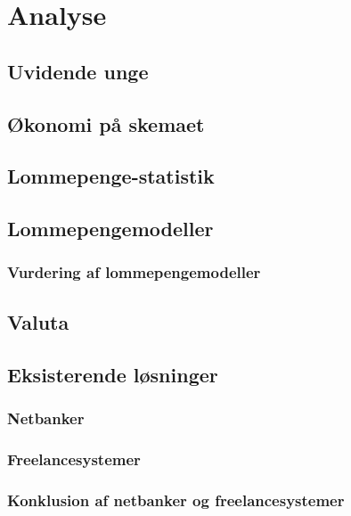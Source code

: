 \chapter{Analyse}

\section{Uvidende unge}
\label{UvidendeUnge}

\section{Økonomi på skemaet}
\label{Okonomi}

\section{Lommepenge-statistik}
\label{LommeStat}

\section{Lommepengemodeller}
\label{LommeModeller}
\subsection{Vurdering af lommepengemodeller}
\label{ModelVurdering}

\section{Valuta}
\label{Valuta}

\section{Eksisterende løsninger}
\subsection{Netbanker}
\subsection{Freelancesystemer}
\subsection{Konklusion af netbanker og freelancesystemer}
\label{DelkonklusionNetFree}
